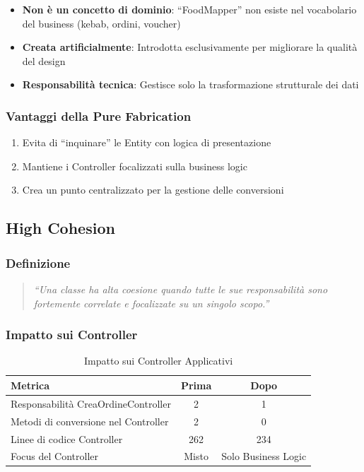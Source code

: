 \documentclass[12pt,a4paper]{article}
\begin{document}
\begin{itemize}
    \item \textbf{Non è un concetto di dominio}: ``FoodMapper'' non esiste nel vocabolario del business (kebab, ordini, voucher)
    \item \textbf{Creata artificialmente}: Introdotta esclusivamente per migliorare la qualità del design
    \item \textbf{Responsabilità tecnica}: Gestisce solo la trasformazione strutturale dei dati
\end{itemize}

\subsubsection{Vantaggi della Pure Fabrication}

\begin{enumerate}
    \item Evita di ``inquinare'' le Entity con logica di presentazione
    \item Mantiene i Controller focalizzati sulla business logic
    \item Crea un punto centralizzato per la gestione delle conversioni
\end{enumerate}

\subsection{High Cohesion}

\subsubsection{Definizione}

\begin{quote}
\textit{``Una classe ha alta coesione quando tutte le sue responsabilità sono fortemente correlate e focalizzate su un singolo scopo.''}
\end{quote}

\subsubsection{Impatto sui Controller}

\begin{table}[h]
\centering
\begin{tabular}{|l|c|c|}
\hline
\textbf{Metrica} & \textbf{Prima} & \textbf{Dopo} \\
\hline
Responsabilità CreaOrdineController & 2 & 1 \\
Metodi di conversione nel Controller & 2 & 0 \\
Linee di codice Controller & 262 & 234 \\
Focus del Controller & Misto & Solo Business Logic \\
\hline
\end{tabular}
\caption{Impatto sui Controller Applicativi}
\end{table}
\end{document}
